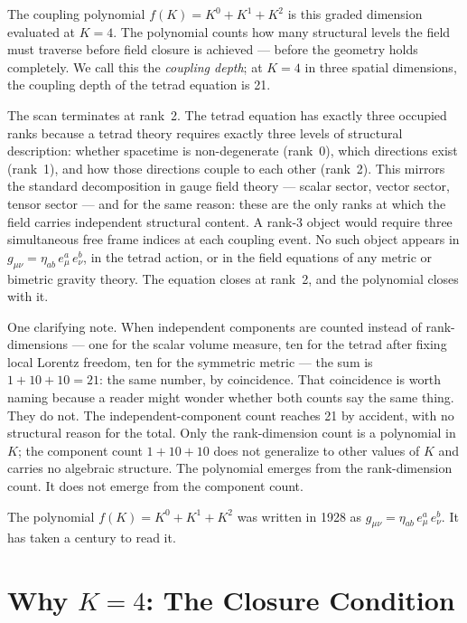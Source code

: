 \documentclass[a4paper,11pt]{article}
\begin{document}
The coupling polynomial $f(K) = K^0 + K^1 + K^2$ is this
graded dimension evaluated at $K = 4$. The polynomial counts how many
structural levels the field must traverse before field
closure is achieved --- before the geometry holds completely.
We call this the \emph{coupling depth}; at $K = 4$ in
three spatial dimensions, the coupling depth of the
tetrad equation is 21.

The scan terminates at rank~2. The tetrad equation has
exactly three occupied ranks because a tetrad theory
requires exactly three levels of structural description:
whether spacetime is non-degenerate (rank~0), which
directions exist (rank~1), and how those directions
couple to each other (rank~2). This mirrors the standard
decomposition in gauge field theory --- scalar sector,
vector sector, tensor sector --- and for the same
reason: these are the only ranks at which the field
carries independent structural content. A rank-3 object
would require three simultaneous free frame indices at
each coupling event. No such object appears in
$g_{\mu\nu} = \eta_{ab}\,e^a_\mu\,e^b_\nu$, in the
tetrad action, or in the field equations of any metric
or bimetric gravity theory. The equation closes at
rank~2, and the polynomial closes with it.

One clarifying note. When independent components are
counted instead of rank-dimensions --- one for the
scalar volume measure, ten for the tetrad after fixing
local Lorentz freedom, ten for the symmetric metric --- the sum is
$1 + 10 + 10 = 21$: the same number, by coincidence.
That coincidence is worth naming because a reader might
wonder whether both counts say the same thing. They
do not. The independent-component count reaches 21 by
accident, with no structural reason for the total. Only
the rank-dimension count is a polynomial in $K$; the
component count $1 + 10 + 10$ does not generalize to
other values of $K$ and carries no algebraic structure.
The polynomial emerges from the rank-dimension count.
It does not emerge from the component count.

The polynomial $f(K) = K^0 + K^1 + K^2$ was written in
1928 as $g_{\mu\nu} = \eta_{ab}\,e^a_\mu\,e^b_\nu$.
It has taken a century to read it.


\section{Why $K = 4$: The Closure Condition}
\end{document}
